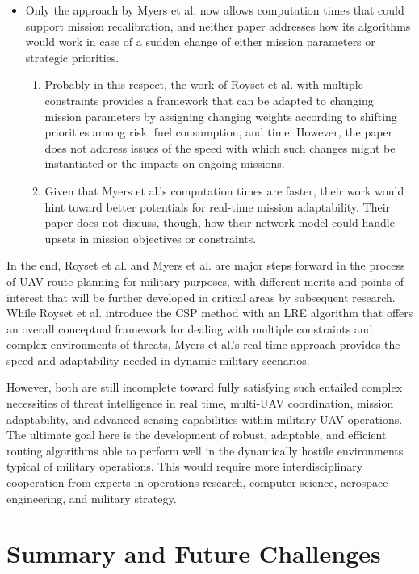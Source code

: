 \documentclass[conference]{IEEEtran}
\begin{document}
\begin{itemize}
    \item Only the approach by Myers et al. now allows computation times that could support mission recalibration, and neither paper addresses how its algorithms would work in case of a sudden change of either mission parameters or strategic priorities.
        \begin{enumerate}
            \item Probably in this respect, the work of Royset et al. with multiple constraints provides a framework that can be adapted to changing mission parameters by assigning changing weights according to shifting priorities among risk, fuel consumption, and time. However, the paper does not address issues of the speed with which such changes might be instantiated or the impacts on ongoing missions.
            \item Given that Myers et al.'s computation times are faster, their work would hint toward better potentials for real-time mission adaptability. Their paper does not discuss, though, how their network model could handle upsets in mission objectives or constraints.
        \end{enumerate}
\end{itemize}

In the end, Royset et al. and Myers et al. are major steps forward in the process of UAV route planning for military purposes, with different merits and points of interest that will be further developed in critical areas by subsequent research. While Royset et al. introduce the CSP method with an LRE algorithm that offers an overall conceptual framework for dealing with multiple constraints and complex environments of threats, Myers et al.'s real-time approach provides the speed and adaptability needed in dynamic military scenarios.

However, both are still incomplete toward fully satisfying such entailed complex necessities of threat intelligence in real time, multi-UAV coordination, mission adaptability, and advanced sensing capabilities within military UAV operations. The ultimate goal here is the development of robust, adaptable, and efficient routing algorithms able to perform well in the dynamically hostile environments typical of military operations. This would require more interdisciplinary cooperation from experts in operations research, computer science, aerospace engineering, and military strategy.

\section{Summary and Future Challenges}
\end{document}
